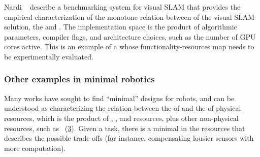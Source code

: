 \begin{figure}[h!]
    \centering
    \caption{}
    \label{fig:progressive-1-1}
\end{figure}

\begin{example}
    Nardi\,\,\etal~\cite{zia16comparative} describe a benchmarking system for visual SLAM that provides the empirical characterization of the monotone relation between  of the visual SLAM solution, the  and .
    The implementation space is the product of algorithmic parameters, compiler flags, and architecture choices, such as the number of GPU cores active.
    This is an example of a  whose functionality-resources map needs to be experimentally evaluated.
\end{example}

\begin{figure}[h!]
    \centering
    \caption{}
    \label{fig:dp_zia}
\end{figure}

\subsubsection{Other examples in minimal robotics}

Many works have sought to find ``minimal'' designs for robots, and can be understood as characterizing the relation between the  of  and the  of physical resources, which is the product of , , and  resources, plus other non-physical resources, such as ~(\cref{fig:robot-generic}).
Given a task, there is a minimal  in the resources  that describes the possible trade-offs (for instance, compensating lousier sensors with more computation).


\begin{figure}
    \centering
    \caption{}
    \label{fig:robot-generic}
\end{figure}


